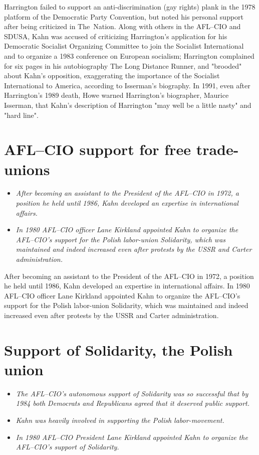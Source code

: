 Harrington failed to support an anti-discrimination (gay rights) plank
in the 1978 platform of the Democratic Party Convention, but noted his
personal support after being criticized in The~Nation. Along with others
in the AFL--CIO and SDUSA, Kahn was accused of criticizing Harrington's
application for his Democratic Socialist Organizing Committee to join
the Socialist International and to organize a 1983 conference on
European socialism; Harrington complained for six pages in his
autobiography The Long Distance Runner, and "brooded" about Kahn's
opposition, exaggerating the importance of the Socialist International
to America, according to Isserman's biography. In 1991, even after
Harrington's 1989 death, Howe warned Harrington's biographer, Maurice
Isserman, that Kahn's description of Harrington "may well be a little
nasty" and "hard line".

\section{AFL--CIO support for free
trade-unions}\label{aflcio-support-for-free-trade-unions}

\begin{itemize}
\item
  \emph{After becoming an assistant to the President of the AFL--CIO in
  1972, a position he held until 1986, Kahn developed an expertise in
  international affairs.}
\item
  \emph{In 1980 AFL--CIO officer Lane Kirkland appointed Kahn to
  organize the AFL--CIO's support for the Polish labor-union Solidarity,
  which was maintained and indeed increased even after protests by the
  USSR and Carter administration.}
\end{itemize}

After becoming an assistant to the President of the AFL--CIO in 1972, a
position he held until 1986, Kahn developed an expertise in
international affairs. In 1980 AFL--CIO officer Lane Kirkland appointed
Kahn to organize the AFL--CIO's support for the Polish labor-union
Solidarity, which was maintained and indeed increased even after
protests by the USSR and Carter administration.

\section{Support of Solidarity, the Polish
union}\label{support-of-solidarity-the-polish-union}

\begin{itemize}
\item
  \emph{The AFL--CIO's autonomous support of Solidarity was so
  successful that by 1984 both Democrats and Republicans agreed that it
  deserved public support.}
\item
  \emph{Kahn was heavily involved in supporting the Polish
  labor-movement.}
\item
  \emph{In 1980 AFL--CIO President Lane Kirkland appointed Kahn to
  organize the AFL--CIO's support of Solidarity.}
\end{itemize}

